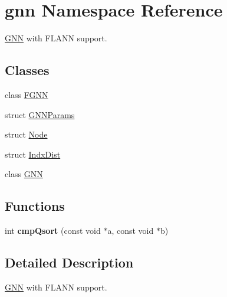 \hypertarget{namespacegnn}{\section{gnn Namespace Reference}
\label{namespacegnn}
}


\hyperlink{classgnn_1_1GNN}{G\-N\-N} with F\-L\-A\-N\-N support.  


\subsection*{Classes}
\begin{DoxyCompactItemize}
\item 
class \hyperlink{classgnn_1_1FGNN}{F\-G\-N\-N}
\item 
struct \hyperlink{structgnn_1_1GNNParams}{G\-N\-N\-Params}
\item 
struct \hyperlink{structgnn_1_1Node}{Node}
\item 
struct \hyperlink{structgnn_1_1IndxDist}{Indx\-Dist}
\item 
class \hyperlink{classgnn_1_1GNN}{G\-N\-N}
\end{DoxyCompactItemize}
\subsection*{Functions}
\begin{DoxyCompactItemize}
\item 
\hypertarget{namespacegnn_aa1886a4cf5a24fa546c37fa1022f8741}{int {\bfseries cmp\-Qsort} (const void $\ast$a, const void $\ast$b)}\label{namespacegnn_aa1886a4cf5a24fa546c37fa1022f8741}

\end{DoxyCompactItemize}


\subsection{Detailed Description}
\hyperlink{classgnn_1_1GNN}{G\-N\-N} with F\-L\-A\-N\-N support. 